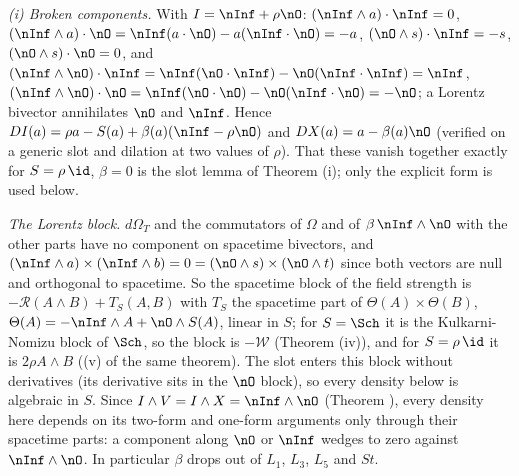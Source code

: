 \emph{(i) Broken components.} With $I = \nInf + \rho\nO$: $(\nInf \wedge a)\cdot\nInf = 0$, $(\nInf \wedge a)\cdot\nO = \nInf(a \cdot \nO) - a(\nInf \cdot \nO) = -a$, $(\nO \wedge s)\cdot\nInf = -s$, $(\nO \wedge s)\cdot\nO = 0$, and $(\nInf \wedge \nO)\cdot\nInf = \nInf(\nO \cdot \nInf) - \nO(\nInf \cdot \nInf) = \nInf$, $(\nInf \wedge \nO)\cdot\nO = \nInf(\nO \cdot \nO) - \nO(\nInf \cdot \nO) = -\nO$; a Lorentz bivector annihilates $\nO$ and $\nInf$. Hence $DI(a) = \rho a - S(a) + \beta(a)(\nInf - \rho\nO)$ and $DX(a) = a - \beta(a)\nO$ (verified on a generic slot and dilation at two values of $\rho$). That these vanish together exactly for $S = \rho\,\id$, $\beta = 0$ is the slot lemma of Theorem (i); only the explicit form is used below.

\emph{The Lorentz block.} $d\Omega_{T}$ and the commutators of $\Omega$ and of $\beta\,\nInf \wedge \nO$ with the other parts have no component on spacetime bivectors, and $(\nInf \wedge a) \times (\nInf \wedge b) = 0 = (\nO \wedge s) \times (\nO \wedge t)$ since both vectors are null and orthogonal to spacetime. So the spacetime block of the field strength is $-\mathcal{R}(A \wedge B) + T_{S}(A, B)$ with $T_{S}$ the spacetime part of $\Theta(A) \times \Theta(B)$, $\Theta(A) = -\nInf \wedge A + \nO \wedge S(A)$, linear in $S$; for $S = \Sch$ it is the Kulkarni-Nomizu block of $\Sch$, so the block is $-\mathcal{W}$ (Theorem (iv)), and for $S = \rho\,\id$ it is $2\rho A \wedge B$ ((v) of the same theorem). The slot enters this block without derivatives (its derivative sits in the $\nO$ block), so every density below is algebraic in $S$. Since $I \wedge V = I \wedge X = \nInf \wedge \nO$ (Theorem ), every density here depends on its two-form and one-form arguments only through their spacetime parts: a component along $\nO$ or $\nInf$ wedges to zero against $\nInf \wedge \nO$. In particular $\beta$ drops out of $L_{1}$, $L_{3}$, $L_{5}$ and $St$.


